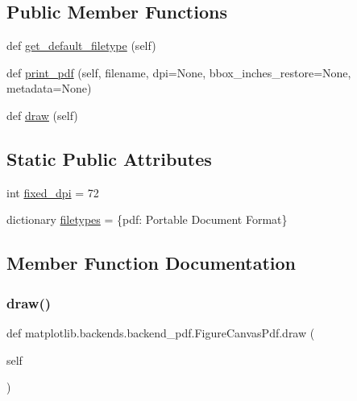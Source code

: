 \subsection*{Public Member Functions}
\begin{DoxyCompactItemize}
\item 
def \hyperlink{classmatplotlib_1_1backends_1_1backend__pdf_1_1FigureCanvasPdf_a6efe8a379939c2a16e1b6bd5134681c3}{get\+\_\+default\+\_\+filetype} (self)
\item 
def \hyperlink{classmatplotlib_1_1backends_1_1backend__pdf_1_1FigureCanvasPdf_a4590e44b79cb2ed5eaefe75e721cf7f4}{print\+\_\+pdf} (self, filename, dpi=None, bbox\+\_\+inches\+\_\+restore=None, metadata=None)
\item 
def \hyperlink{classmatplotlib_1_1backends_1_1backend__pdf_1_1FigureCanvasPdf_a1786c84f3709bbb558b569192208990b}{draw} (self)
\end{DoxyCompactItemize}
\subsection*{Static Public Attributes}
\begin{DoxyCompactItemize}
\item 
int \hyperlink{classmatplotlib_1_1backends_1_1backend__pdf_1_1FigureCanvasPdf_a414b4a467ba8c29ab93ea9662979ebb3}{fixed\+\_\+dpi} = 72
\item 
dictionary \hyperlink{classmatplotlib_1_1backends_1_1backend__pdf_1_1FigureCanvasPdf_ab8e147d8ecd5f17fbdbf148343d8ca87}{filetypes} = \{\textquotesingle{}pdf\textquotesingle{}\+: \textquotesingle{}Portable Document Format\textquotesingle{}\}
\end{DoxyCompactItemize}


\subsection{Member Function Documentation}
\mbox{\label{classmatplotlib_1_1backends_1_1backend__pdf_1_1FigureCanvasPdf_a1786c84f3709bbb558b569192208990b}} 
\subsubsection{\texorpdfstring{draw()}{draw()}}
{\footnotesize\ttfamily def matplotlib.\+backends.\+backend\+\_\+pdf.\+Figure\+Canvas\+Pdf.\+draw (\begin{DoxyParamCaption}\item[{}]{self }\end{DoxyParamCaption})}

